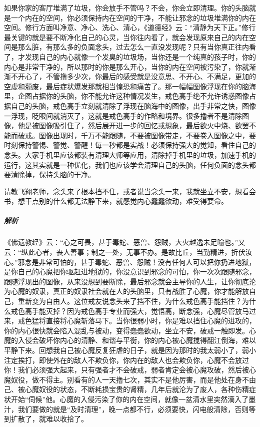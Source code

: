 如果你家的客厅堆满了垃圾，你会放手不管吗？不会，你会立即清理。你的头脑就是一个内在的空间，你必须保持内在空间的干净，不能让邪念的垃圾堆满你的内在空间。修行方面叫净意、净心、洗心、清心，《道德经》云：“清静为天下正。”修行最关键的就是要不断净化自己的心灵，当你往内看了，就会发现原来自己的内在空间是那么脏，有那么多的负面念头，过去怎么一直没发现呢？只有当你真正往内看了，才发现自己的内心就像一个发臭的垃圾场，当你还是一个纯真的孩子时，你的内心是非常干净的，所以那时的你是那么开心，当你的内在空间被污染了，你就渐渐不开心了，不管撸多少次，你最后的感受就是没意思、不开心、不满足，更加的空虚和颓废，最后症状爆发那就相当惶恐和痛苦了。那一幅幅图像浮现在你的脑海里，企图占据你的头脑，你不能允许这种情况发生，戒色高手绝不允许诱惑图像占据自己的头脑，戒色高手立刻就清除了浮现在脑海中的图像，出手非常之快，图像一浮现，眨眼间就消灭了，这就是戒色高手的作略和境界。很多撸者不是清除图像，他是被图像吸引住了，然后展开进一步的回忆或想象，最后欲火中烧、欲罢不能而破戒。图像出现时，千万不能跟随，不要被图像带走，不要卷入图像之中，要时刻保持警惕、警觉、警醒！每一秒都是实战！必须保持强大的觉知，看住自己的念头。大家手机里应该都装有清理大师等应用，清除掉手机里的垃圾，加速手机的运行，这其实就是一种优化，我们也应该学会清理自己的头脑，任何负面的念头都要清除掉，保持头脑的干净。

\begin{case}
    请教飞翔老师，念头来了根本挡不住，或者说当念头一来，我就坐立不安，想看会书，想干点别的什么都无法静下来，就感觉内心蠢蠢欲动，难受得要命。
    \subparagraph{解析} 《佛遗教经》云：“心之可畏，甚于毒蛇、恶兽、怨贼，大火越逸未足喻也。”又云：“纵此心者，丧人善事；制之一处，无事不办。是故比丘，当勤精进，折伏汝心。”邪念是非常可怕的，甚于毒蛇、恶兽、怨贼！没有任何人可以把你扔进地狱，是你自己的心魔把你驱赶进地狱的，你没意识到邪念的可怕，你一次次跟随邪念，跟随浮现出的图像，从来没想到要断除，最后邪念就会主导你的人生，让你彻底沦为心魔的奴隶，真正的奴隶社会就在人的头脑里，只有战胜了心魔，你才能解放自己，重新变为自由人。这位戒友说念头来了挡不住，为什么戒色高手能挡住？为什么戒色高手能灭掉？因为戒色高手专业而强大，觉悟高，断念强，心魔尽管放马过来，戒色猛将直接将心魔斩落马下。当你很弱小时，你是难以挡住心魔的进攻的，你的内心很快就会陷入混乱与被动，变得蠢蠢欲动，坐立不安，破戒一触即发。心魔的入侵会破坏你内心的清静、和谐与平衡，你的内心被心魔搅得翻江倒海，难以平静下来。回想我自己被心魔反复狂虐的日子，就是因为那时的我太弱小了，弱小注定挨打，即使外在的敌人不欺负你，你内在的敌人也会欺负你，心魔不会放过你！我们必须强大起来，只有强者才不会破戒，弱者肯定会被心魔攻破，然后被心魔奴役，做不得主。别看有的人一天撸七次，其实不是他厉害，而是他处在身不由己、被心魔奴役的状态，不断耗损宝贵的肾精，几年后就沦为了废人，各种伤精症状开始“伺候”他。心魔的入侵污染了你的内在空间，就像一盆清水里突然滴入了墨汁，我们要做的就是“及时清理”，晚一点都不行，必须要快，闪电般清除，否则等到扩散了，就难以收拾了。
\end{case}

